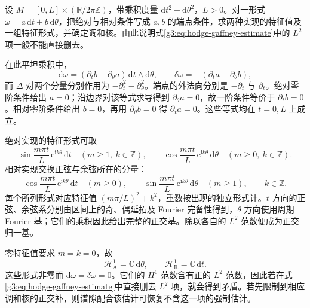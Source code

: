 \begin{exercise}\label{g3:ex:cylinder-hodge-boundary-spectrum}
	设 \(M=[0,L]\times(\mathbb R/2\pi\mathbb Z)\)，带乘积度量 \(\mathrm dt^2+\mathrm d\theta^2\)，\(L>0\)。对一形式 \(\omega=a\,\mathrm dt+b\,\mathrm d\theta\)，把绝对与相对条件写成 \(a,b\) 的端点条件，求两种实现的特征值及一组特征形式，并确定调和核。由此说明式\eqref{g3:eq:hodge-gaffney-estimate}中的 \(L^2\) 项一般不能直接删去。
\end{exercise}
\begin{solution}
	在此平坦乘积中，
	\[
		\mathrm d\omega=(\partial_tb-\partial_\theta a)
		\,\mathrm dt\wedge\mathrm d\theta,
		\qquad
		\delta\omega=-(\partial_ta+\partial_\theta b),
	\]
	而 \(\Delta\) 对两个分量分别作用为 \(-\partial_t^2-\partial_\theta^2\)。端点的外法向分别是 \(-\partial_t\) 与 \(\partial_t\)。绝对零阶条件给出 \(a=0\)；沿边界对该等式求导得到 \(\partial_\theta a=0\)，故一阶条件等价于 \(\partial_tb=0\)。相对零阶条件给出 \(b=0\)，再用 \(\partial_\theta b=0\) 得 \(\partial_ta=0\)。这些等式均在 \(t=0,L\) 上成立。

	绝对实现的特征形式可取
	\[
		\sin\frac{m\pi t}{L}\,\mathrm e^{\mathrm i k\theta}\,\mathrm dt
		\quad(m\ge1,\ k\in\mathbb Z),\qquad
		\cos\frac{m\pi t}{L}\,\mathrm e^{\mathrm i k\theta}\,\mathrm d\theta
		\quad(m\ge0,\ k\in\mathbb Z).
	\]
	相对实现交换正弦与余弦所在的分量：
	\[
		\cos\frac{m\pi t}{L}\,\mathrm e^{\mathrm i k\theta}\,\mathrm dt
		\quad(m\ge0),\qquad
		\sin\frac{m\pi t}{L}\,\mathrm e^{\mathrm i k\theta}\,\mathrm d\theta
		\quad(m\ge1),\qquad k\in\mathbb Z.
	\]
	每个所列形式对应特征值 \((m\pi/L)^2+k^2\)，重数按出现的独立形式计。\(t\) 方向的正弦、余弦系分别由区间上的奇、偶延拓及 Fourier 完备性得到，\(\theta\) 方向使用周期 Fourier 基；它们的乘积因此给出完整的正交基。除以各自的 \(L^2\) 范数便成为正交归一基。

	零特征值要求 \(m=k=0\)，故
	\[
		\mathcal H_{\mathrm A}^1=\mathbb C\,\mathrm d\theta,
		\qquad \mathcal H_{\mathrm R}^1=\mathbb C\,\mathrm dt.
	\]
	这些形式非零而 \(\mathrm d\omega=\delta\omega=0\)。它们的 \(H^1\) 范数含有正的 \(L^2\) 范数，因此若在式\eqref{g3:eq:hodge-gaffney-estimate}中直接删去 \(L^2\) 项，就会得到矛盾。若先限制到相应调和核的正交补，则谱隙配合该估计可恢复不含这一项的强制估计。
\end{solution}

